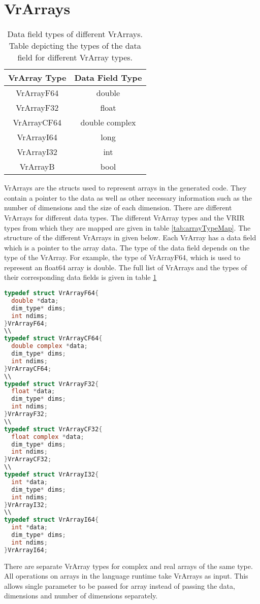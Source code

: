 \section{VrArrays}
\label{sec:vrarray}
\begin{table}[htbp]
\centering
\begin{tabular}{|c|c|}
\hline
VrArray Type & Data Field Type \\ \hline
VrArrayF64   & double          \\ \hline
VrArrayF32   & float           \\ \hline
VrArrayCF64  & double complex  \\ \hline
VrArrayI64   & long            \\ \hline
VrArrayI32   & int             \\ \hline
VrArrayB     & bool            \\ \hline
\end{tabular}
\caption[Data field types of different VrArrays]{Data field types of different VrArrays. Table depicting the types of the data field for different VrArray types.}
\label{tab:arrayDataMap}
\end{table}
VrArrays are the structs used to represent arrays in the generated code. They contain a pointer to the data as well as other necessary information such as the number of dimensions and the size of each dimension. There are different VrArrays for different data types. The different VrArray types and the VRIR types from which they are mapped are given in table \ref{tab:arrayTypeMap}. The structure of the different VrArrays in given below. Each VrArray has a data field which is a pointer to the array data. The type of the data field depends on the type of the VrArray. For example, the type of VrArrayF64, which is used to represent an float64 array is double. The full list of VrArrays and the types of their corresponding data fields is given in table \ref{tab:arrayDataMap}
\begin{lstlisting}[language=c, label={vrArrayF64Struct}, caption={Structures of different VrArrays}]
typedef struct VrArrayF64{
  double *data;
  dim_type* dims;  
  int ndims;
}VrArrayF64;
\\
typedef struct VrArrayCF64{
  double complex *data;
  dim_type* dims;  
  int ndims;
}VrArrayCF64;
\\
typedef struct VrArrayF32{
  float *data;
  dim_type* dims;  
  int ndims;
}VrArrayF32;
\\
typedef struct VrArrayCF32{
  float complex *data;
  dim_type* dims;  
  int ndims;
}VrArrayCF32;
\\
typedef struct VrArrayI32{
  int *data;
  dim_type* dims;  
  int ndims;
}VrArrayI32;
\\
typedef struct VrArrayI64{
  int *data;
  dim_type* dims;  
  int ndims;
}VrArrayI64;
\end{lstlisting}
There are separate VrArray types for complex and real arrays of the same type. All operations on arrays in the language runtime take VrArrays as input. This allows single parameter to be passed for array instead of passing the data, dimensions and number of dimensions separately.
